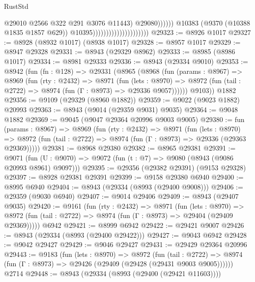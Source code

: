\begin{lexlean}{RustStd}
\begin{coremodule}
                                                            @29010
                                                            @2566
                                                            @322
                                                            @291
                                                            @3076
                                                            @11443)
                                                          @29080))))))
                                              @10383
                                              (@9370 (@10388 @1835 @1857 @629))
                                              @10395)))))))))))))))))))))
@29323 := @8926 @1017
@29327 := @8928 (@8932 @1017) (@8938 @1017)
@29328 := @8957 @1017
@29329 := @8947 @29328
@29331 := @8943 (@29329 @8962)
@29333 := @8985 (@8986 @1017)
@29334 := @8981 @29333
@29336 := @8943 (@29334 @9010)
@29353 := @8942
    (fun (fn : @128) =>
    @29331
      (@8965
        (@8968
          (fun (params : @8967) =>
          @8969
            (fun (rty : @2432) =>
            @8971
              (fun (lets : @8970) =>
              @8972 (fun (tail : @2722) => @8974 (fun (Γ : @8973) => @29336 @9057))))))
        @9103))
    @1882
@29356 := @9109 (@29329 (@8960 @1882))
@29359 := @9022 (@9023 @1882) @20993
@29363 := @8943 (@9014 (@29359 @9031) @9035)
@29364 := @9048 @1882
@29369 := @9045 (@9047 @29364 @20996 @9003 @9005)
@29380 := fun (params : @8967) =>
  @8969
    (fun (rty : @2432) =>
    @8971
      (fun (lets : @8970) =>
      @8972 (fun (tail : @2722) => @8974 (fun (Γ : @8973) => @29336 (@29363 @29369)))))
@29381 := @8968 @29380
@29382 := @8965 @29381
@29391 := @9071
    (fun (U : @9070) => @9072 (fun (t : @7) => @9080 (@8943 (@9086 @20993 @8961) @9097)))
@29395 := @29356 (@29382 @29391) (@9153 @29328)
@29397 := @8928 @29381 @29391
@29399 := @9158 @29380 @6940
@29400 := @8995 @6940
@29404 := @8943 (@29334 (@8993 (@29400 @9008)))
@29406 := @29359 (@9030 @6940)
@29407 := @9014 @29406
@29409 := @8943 (@29407 @9035)
@29420 := @9161
    (fun (rty : @2432) =>
    @8971
      (fun (lets : @8970) =>
      @8972 (fun (tail : @2722) => @8974 (fun (Γ : @8973) => @29404 (@29409 @29369)))))
    @6942
@29421 := @8999 @6942
@29422 := @29421 @9007
@29426 := @8943 (@29334 (@8993 (@29400 @29422)))
@29427 := @9043 @6942
@29428 := @9042 @29427
@29429 := @9046 @29427
@29431 := @29429 @29364 @20996
@29443 := @9183
    (fun (lets : @8970) =>
    @8972
      (fun (tail : @2722) =>
      @8974 (fun (Γ : @8973) => @29426 (@29409 (@29428 (@29431 @9003 @9005))))))
    @2714
@29448 := @8943 (@29334 (@8993 (@29400 (@29421 @11603))))

\end{coremodule}
\end{lexlean}
